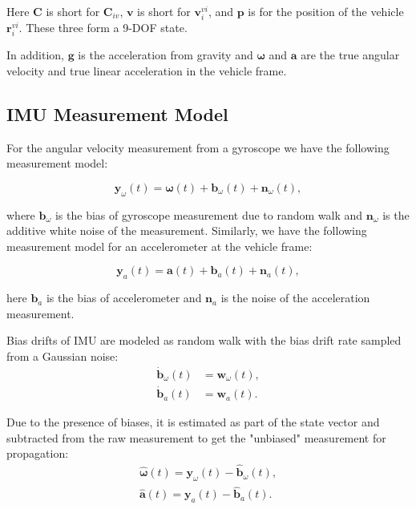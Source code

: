 \documentclass[conference]{IEEEtran}
\begin{document}
Here $\textbf{C}$ is short for $\textbf{C}_{iv}$, $\textbf{v}$ is short for $\textbf{v}_i^{vi}$, and $\textbf{p}$ is for the position of the vehicle $\textbf{r}_i^{vi}$. These three form a 9-DOF state.

In addition, $\textbf{g}$ is the acceleration from gravity and $\bm{\omega}$ and $\textbf{a}$ are the true angular velocity and true linear acceleration in the vehicle frame.

\subsection{IMU Measurement Model}

For the angular velocity measurement from a gyroscope we have the following measurement model:

\begin{equation}
    \textbf{y}_\omega(t) = \bm{\omega}(t) + \textbf{b}_\omega(t) + \textbf{n}_\omega(t),
\end{equation}

\noindent where $\textbf{b}_\omega$ is the bias of gyroscope measurement due to random walk and $\textbf{n}_\omega$ is the additive white noise of the measurement. Similarly, we have the following measurement model for an accelerometer at the vehicle frame:

\begin{equation}
    \textbf{y}_a(t) = \textbf{a}(t) + \textbf{b}_a(t) + \textbf{n}_a(t),
\end{equation}

\noindent here $\textbf{b}_a$ is the bias of accelerometer and $\textbf{n}_a$ is the noise of the acceleration measurement.

Bias drifts of IMU are modeled as random walk with the bias drift rate sampled from a Gaussian noise:
\begin{equation}
\begin{split}
    \dot{\textbf{b}}_\omega(t) &= \textbf{w}_\omega(t), \\
    \dot{\textbf{b}}_a(t) &= \textbf{w}_a(t).
\end{split}
\end{equation}

\noindent Due to the presence of biases, it is estimated as part of the state vector and subtracted from the raw measurement to get the "unbiased" measurement for propagation:
\begin{equation}
\begin{split}
    \hat{\bm{\omega}}(t) = \textbf{y}_\omega(t) - \hat{\textbf{b}}_\omega(t), \\
    \hat{\textbf{a}}(t)  = \textbf{y}_a(t) - \hat{\textbf{b}}_a(t).
\end{split}
\end{equation}
\end{document}
